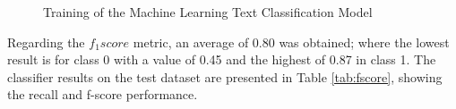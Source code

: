 \documentclass[onecolumn, journal, english, 12pt, a4paper]{IEEEtran} %
\theoremstyle{definition}
\begin{document}
\begin{figure}[!t]
\centering
{}
\hfil
{}
\caption{Training of the Machine Learning Text Classification Model}
\label{fig: results}
\end{figure}

Regarding the $f_1score$ metric, an average of 0.80 was obtained;
where the lowest result is for class 0 with a value of 0.45 and the
highest of 0.87 in class 1. The classifier results on the test dataset
are presented in Table \ref{tab:fscore}, showing the recall and
f-score performance.
\end{document}
